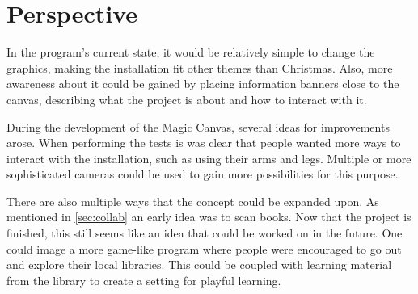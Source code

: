 \chapter{Perspective}
In the program's current state, it would be relatively simple to change the graphics, making the installation fit other themes than Christmas. Also, more awareness about it could be gained by placing information banners close to the canvas, describing what the project is about and how to interact with it.

During the development of the Magic Canvas, several ideas for improvements arose. When performing the tests is was clear that people wanted more ways to interact with the installation, such as using their arms and legs. Multiple or more sophisticated cameras could be used to gain more possibilities for this purpose.

There are also multiple ways that the concept could be expanded upon. As mentioned in \ref{sec:collab} an early idea was to scan books. Now that the project is finished, this still seems like an idea that could be worked on in the future. One could image a more game-like program where people were encouraged to go out and explore their local libraries. This could be coupled with learning material from the library to create a setting for playful learning.